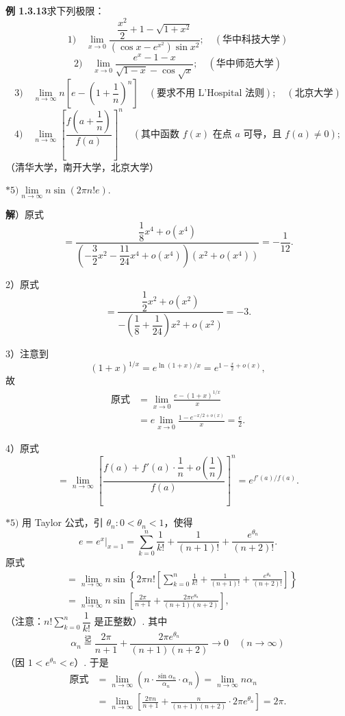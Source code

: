 \documentclass[UTF8,12pt,a4paper,fontset=fandol]{ctexart}
\begin{document}
\noindent\textbf{例 1.3.13}\quad 求下列极限：
\[
1)\quad
\lim_{x\to0}\frac{\dfrac{x^2}{2}+1-\sqrt{1+x^2}}
{(\cos x-e^{x^2})\sin x^2};\quad(\text{华中科技大学})
\]
\[
2)\quad
\lim_{x\to0}\frac{e^x-1-x}{\sqrt{1-x}-\cos\sqrt x};\quad(\text{华中师范大学})
\]
\[
3)\quad
\lim_{n\to\infty}n\left[e-\left(1+\frac1n\right)^n\right]\quad
(\text{要求不用 L'Hospital 法则});\quad(\text{北京大学})
\]
\[
4)\quad
\lim_{n\to\infty}\left[\frac{f\left(a+\dfrac1n\right)}{f(a)}\right]^n
\quad(\text{其中函数 }f(x)\text{ 在点 }a\text{ 可导，且 }f(a)\ne0);
\]
（清华大学，南开大学，北京大学）

$*5)$\quad $\lim\limits_{n\to\infty}n\sin(2\pi n!e)$.

\noindent\textbf{解}）原式
\[
  =\frac{\dfrac18x^4+o(x^4)}
  {\left(-\dfrac32x^2-\dfrac{11}{24}x^4+o(x^4)\right)(x^2+o(x^4))}
  =-\frac1{12}.
\]

2）原式
\[
  =\frac{\dfrac12x^2+o(x^2)}
  {-\left(\dfrac18+\dfrac1{24}\right)x^2+o(x^2)}
  =-3.
\]

3）注意到
\[
  (1+x)^{1/x}=e^{\ln(1+x)/x}
  =e^{1-\frac{x}{2}+o(x)},
\]
故
\[
\begin{aligned}
\text{原式}
&=\lim_{x\to0}\frac{e-(1+x)^{1/x}}x\\
&=e\lim_{x\to0}\frac{1-e^{-x/2+o(x)}}x=\frac e2.
\end{aligned}
\]

4）原式
\[
  =\lim_{n\to\infty}
  \left[
    \frac{f(a)+f'(a)\cdot\dfrac1n+o\left(\dfrac1n\right)}
    {f(a)}
  \right]^n
  =e^{f'(a)/f(a)}.
\]

$*5)$ 用 Taylor 公式，引 $\theta_n:0<\theta_n<1$，使得
\[
  e=e^x\big|_{x=1}
  =\sum_{k=0}^n\frac1{k!}
  +\frac1{(n+1)!}+\frac{e^{\theta_n}}{(n+2)!}.
\]
原式
\[
\begin{aligned}
&=\lim_{n\to\infty}n\sin\left\{2\pi n!\left[
\sum_{k=0}^n\frac1{k!}
+\frac1{(n+1)!}+\frac{e^{\theta_n}}{(n+2)!}
\right]\right\}\\
&=\lim_{n\to\infty}n\sin\left[
\frac{2\pi}{n+1}
+\frac{2\pi e^{\theta_n}}{(n+1)(n+2)}
\right],
\end{aligned}
\]
（注意：$n!\sum\limits_{k=0}^n\dfrac1{k!}$ 是正整数）. 其中
\[
  \alpha_n\stackrel{\text{记}}{=}
  \frac{2\pi}{n+1}
  +\frac{2\pi e^{\theta_n}}{(n+1)(n+2)}
  \to0\quad(n\to\infty)
\]
（因 $1<e^{\theta_n}<e$）. 于是
\[
\begin{aligned}
\text{原式}
&=\lim_{n\to\infty}\left(n\cdot\frac{\sin\alpha_n}{\alpha_n}\cdot\alpha_n\right)
=\lim_{n\to\infty}n\alpha_n\\
&=\lim_{n\to\infty}
\left[\frac{2\pi n}{n+1}
+\frac{n}{(n+1)(n+2)}\cdot2\pi e^{\theta_n}\right]
=2\pi.
\end{aligned}
\]
\end{document}
